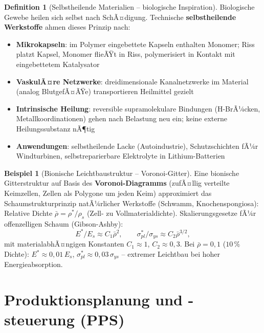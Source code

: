 ﻿\documentclass[a4paper,12pt]{report}
\theoremstyle{definition}
\newtheorem{definition}{Definition}
\newtheorem{beispiel}{Beispiel}
\begin{document}
\begin{definition}[Selbstheilende Materialien -- biologische Inspiration]
Biologische Gewebe heilen sich selbst nach SchÃ¤digung. Technische
\textbf{selbstheilende Werkstoffe} ahmen dieses Prinzip nach:
\begin{itemize}
    \item[-] \textbf{Mikrokapseln}: im Polymer eingebettete Kapseln
          enthalten Monomer; Riss platzt Kapsel, Monomer flieÃŸt in Riss,
          polymerisiert in Kontakt mit eingebettetem Katalysator
    \item[-] \textbf{VaskulÃ¤re Netzwerke}: dreidimensionale Kanalnetzwerke
          im Material (analog BlutgefÃ¤ÃŸe) transportieren Heilmittel gezielt
    \item[-] \textbf{Intrinsische Heilung}: reversible supramolekulare Bindungen
          (H-BrÃ¼cken, Metallkoordinationen) gehen nach Belastung neu ein;
          keine externe Heilungssubstanz nÃ¶tig
    \item[-] \textbf{Anwendungen}: selbstheilende Lacke (Autoindustrie),
          Schutzschichten fÃ¼r Windturbinen, selbstreparierbare Elektrolyte
          in Lithium-Batterien
\end{itemize}
\end{definition}

\begin{beispiel}[Bionische Leichtbaustruktur -- Voronoi-Gitter]
Eine bionische Gitterstruktur auf Basis des \textbf{Voronoi-Diagramms}
(zufÃ¤llig verteilte Keimzellen, Zellen als Polygone um jeden Keim)
approximiert das Schaumstrukturprinzip natÃ¼rlicher Werkstoffe (Schwamm, Knochenspongiosa):
Relative Dichte $\bar{\rho} = \rho^*/\rho_s$ (Zell- zu Vollmaterialdichte).
Skalierungsgesetze fÃ¼r offenzelligen Schaum (Gibson-Ashby):
\[
  E^*/E_s \approx C_1 \bar{\rho}^2, \qquad \sigma_{pl}^*/\sigma_{ys} \approx C_2 \bar{\rho}^{3/2},
\]
mit materialabhÃ¤ngigen Konstanten $C_1 \approx 1$, $C_2 \approx 0{,}3$.
Bei $\bar{\rho} = 0{,}1$ ($10\,\%$ Dichte): $E^* \approx 0{,}01\,E_s$,
$\sigma_{pl}^* \approx 0{,}03\,\sigma_{ys}$ -- extremer Leichtbau bei hoher Energieabsorption.
\end{beispiel}


\section{Produktionsplanung und -steuerung (PPS)}
\end{document}
